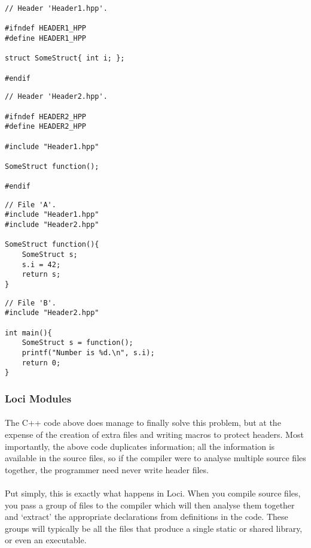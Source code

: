 \documentclass[12pt,twoside,notitlepage]{report}
\begin{document}
\begin{lstlisting}
// Header 'Header1.hpp'.

#ifndef HEADER1_HPP
#define HEADER1_HPP

struct SomeStruct{ int i; };

#endif
\end{lstlisting}

\begin{lstlisting}
// Header 'Header2.hpp'.

#ifndef HEADER2_HPP
#define HEADER2_HPP

#include "Header1.hpp"

SomeStruct function();

#endif
\end{lstlisting}

\begin{lstlisting}
// File 'A'.
#include "Header1.hpp"
#include "Header2.hpp"

SomeStruct function(){
	SomeStruct s;
	s.i = 42;
	return s;
}
\end{lstlisting}

\begin{lstlisting}
// File 'B'.
#include "Header2.hpp"

int main(){
	SomeStruct s = function();
	printf("Number is %d.\n", s.i);
	return 0;
}
\end{lstlisting}

\subsubsection{Loci Modules}

\paragraph{}
The C++ code above does manage to finally solve this problem, but at the expense of the creation of extra files and writing macros to protect headers. Most importantly, the above code duplicates information; all the information is available in the source files, so if the compiler were to analyse multiple source files together, the programmer need never write header files.

\paragraph{}
Put simply, this is exactly what happens in Loci. When you compile source files, you pass a group of files to the compiler which will then analyse them together and `extract' the appropriate declarations from definitions in the code. These groups will typically be all the files that produce a single static or shared library, or even an executable.
\end{document}
